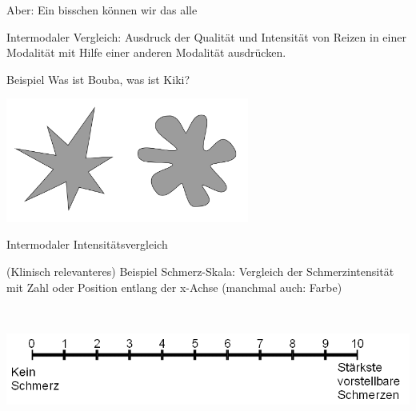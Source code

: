 \documentclass[aspectratio=169]{beamer}
\begin{document}

\begin{frame}{Aber: Ein bisschen können wir das alle}

Intermodaler Vergleich: Ausdruck der Qualität und Intensität von Reizen in einer Modalität mit Hilfe einer anderen Modalität ausdrücken.   \\[0.5 cm]  

\begin{block}{Beispiel}
Was ist Bouba, was ist Kiki?
\end{block}
    
    \begin{center}
        \includegraphics[width=0.6\textwidth]{Booba-Kiki.png}
    \end{center}
    
    
    
\end{frame}


\begin{frame}{Intermodaler Intensitätsvergleich}


\begin{block}{(Klinisch relevanteres) Beispiel}
Schmerz-Skala: Vergleich der Schmerzintensität mit Zahl oder Position entlang der x-Achse (manchmal auch: Farbe)

\end{block}

$\,$\\[0.5 cm]

\begin{center}
    \includegraphics[width=\textwidth]{Numerische_Rating-Skala.png}
\end{center}



\end{frame}
\end{document}
